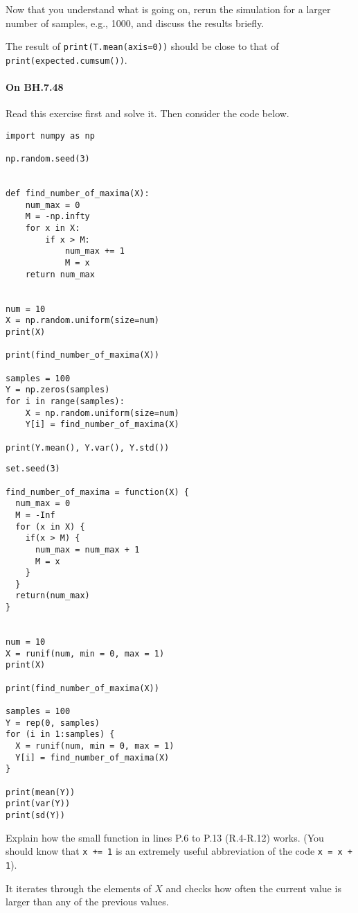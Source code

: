 \documentclass[assignments]{subfiles}
\begin{document}
\begin{exercise}
 Now that you understand what is going on, rerun the simulation for a larger number of samples, e.g., 1000, and discuss the results briefly.
\begin{solution}
The result of \verb|print(T.mean(axis=0))| should be close to that of \verb|print(expected.cumsum())|.
\end{solution}
\end{exercise}

\paragraph{On   BH.7.48} Read this exercise first and solve it. Then consider the code below.

\begin{verbatim}
import numpy as np

np.random.seed(3)


def find_number_of_maxima(X):
    num_max = 0
    M = -np.infty
    for x in X:
        if x > M:
            num_max += 1
            M = x
    return num_max


num = 10
X = np.random.uniform(size=num)
print(X)

print(find_number_of_maxima(X))

samples = 100
Y = np.zeros(samples)
for i in range(samples):
    X = np.random.uniform(size=num)
    Y[i] = find_number_of_maxima(X)

print(Y.mean(), Y.var(), Y.std())
\end{verbatim}


\begin{verbatim}
set.seed(3)

find_number_of_maxima = function(X) {
  num_max = 0
  M = -Inf
  for (x in X) {
    if(x > M) {
      num_max = num_max + 1
      M = x
    }
  }
  return(num_max)
}


num = 10
X = runif(num, min = 0, max = 1)
print(X)

print(find_number_of_maxima(X))

samples = 100
Y = rep(0, samples)
for (i in 1:samples) {
  X = runif(num, min = 0, max = 1)
  Y[i] = find_number_of_maxima(X)
}

print(mean(Y))
print(var(Y))
print(sd(Y))
\end{verbatim}

\begin{exercise}
Explain how the small function in lines P.6 to P.13 (R.4-R.12) works.
(You should know that \texttt{x += 1} is an extremely useful abbreviation of the code \texttt{x = x + 1}).
\begin{solution}
It iterates through the elements of $X$ and checks how often the current value is larger than any of the previous values.
\end{solution}
\end{exercise}
\end{document}
